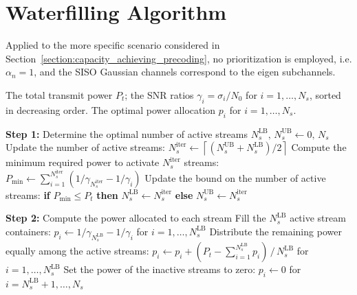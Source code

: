 \section{Waterfilling Algorithm}
\label{app_section:waterfilling_algorithm}

Applied to the more specific scenario considered in Section~\ref{section:capacity_achieving_precoding}, no prioritization is employed, i.e. $\alpha_n = 1$, and the \ac{SISO} Gaussian channels correspond to the eigen subchannels.

\begin{algorithm}[H]
\caption{Waterfilling Algorithm for power allocation across eigen subchannels}
\label{alg:waterfilling}
\begin{algorithmic}[1]
    \Require The total transmit power $P_t$; the SNR ratios $\gamma_i = \sigma_i / N_0$ for $i = 1, \dots, N_s$, sorted in decreasing order.
    \Ensure  The optimal power allocation $p_i$ for $i = 1, \dots, N_s$.
    
    \smallskip
    \Statex \hspace{-\algorithmicindent}\textbf{Step 1:} Determine the optimal number of active streams
    \State $N_s^{\mathrm{LB}}, \, N_s^{\mathrm{UB}} \leftarrow 0, \, N_s$
        \Statex \hspace{\algorithmicindent/2} Update the number of active streams: 
        \State \hspace{\algorithmicindent/2} $N_s^{\mathrm{iter}} \leftarrow \left\lceil (N_s^{\mathrm{UB}} + N_s^{\mathrm{LB}}) / 2 \right\rceil$
        \Statex \hspace{\algorithmicindent/2} Compute the minimum required power to activate $N_s^{\mathrm{iter}}$ streams:
        \State \hspace{\algorithmicindent/2} $P_{\mathrm{min}} \leftarrow \textstyle\sum_{i=1}^{N_s^{\mathrm{iter}}} \left( 1/\gamma_{N_s^{\mathrm{iter}}} - 1/\gamma_i \right)$
        \Statex \hspace{\algorithmicindent/2} Update the bound on the number of active streams:
        \State \hspace{\algorithmicindent/2} \textbf{if} $P_{\mathrm{min}} \leq P_t$ \textbf{then} $N_s^{\mathrm{LB}} \leftarrow N_s^{\mathrm{iter}}$ \textbf{else} $N_s^{\mathrm{UB}} \leftarrow N_s^{\mathrm{iter}}$
    \EndWhile
    
    \smallskip
    \Statex \hspace{-\algorithmicindent}\textbf{Step 2:} Compute the power allocated to each stream
    \Statex Fill the $N_s^{\mathrm{LB}}$ active stream containers:
    \State \indent $p_i \leftarrow 1/\gamma_{N_s^{\mathrm{LB}}} - 1/\gamma_i$ \quad for $i = 1, \dots, N_s^{\mathrm{LB}}$
    \Statex Distribute the remaining power equally among the active streams:
    \State \indent $p_i \leftarrow p_i + (P_t - \textstyle\sum_{i=1}^{N_s^{\mathrm{LB}}} p_i)\, /\, N_s^{\mathrm{LB}}$ \quad for $i = 1, \dots, N_s^{\mathrm{LB}}$
    \Statex Set the power of the inactive streams to zero:
    \State \indent $p_i \leftarrow 0$ \quad for $i = N_s^{\mathrm{LB}} + 1, \dots, N_s$
    

\end{algorithmic}
\end{algorithm}
